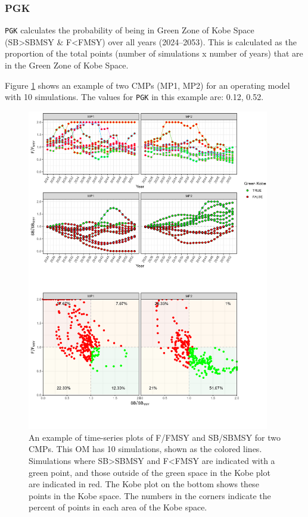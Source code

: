 \documentclass[
]{article}
\begin{document}
\hypertarget{pgk}{%
\subsubsection{PGK}\label{pgk}}

\texttt{PGK} calculates the probability of being in Green Zone of Kobe Space (SB\textgreater SBMSY \& F\textless FMSY) over all years (2024--2053). This is calculated as the proportion of the total points (number of simulations x number of years) that are in the Green Zone of Kobe Space.

Figure \ref{fig:PGK} shows an example of two CMPs (MP1, MP2) for an operating model with 10 simulations. The values for \texttt{PGK} in this example are: 0.12, 0.52.

\begin{figure}
\includegraphics[width=400px]{../../img/PMs/PGK} \caption{An example of time-series plots of F/FMSY and SB/SBMSY for two CMPs. This OM has 10 simulations, shown as the colored lines. Simulations where SB>SBMSY and F<FMSY are indicated with a green point, and those outside of the green space in the Kobe plot are indicated in red. The Kobe plot on the bottom shows these points in the Kobe space. The numbers in the corners indicate the percent of points in each area of the Kobe space.}\label{fig:PGK}
\end{figure}
\end{document}
